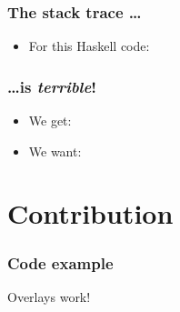 \documentclass[11pt]{beamer} %
\begin{document}
  \begin{frame}
   \frametitle{The stack trace \dots}
  \begin{itemize}
   \item For this Haskell code:
     \HaskellSTCode
  \end{itemize}
  \end{frame}

  \begin{frame}
   \frametitle{\dots is \emph{terrible}!}
  \begin{itemize}
   \item <1-> We get:
     \OriginalTraceCode
   \item <2-> We want:
     \IdealTraceCode
  \end{itemize}
  \end{frame}

\section{Contribution}
\begin{frame}
 \frametitle{}
\end{frame}

\begin{frame}
\frametitle{Code example}
\exampleCode
\pause
Overlays work!
\end{frame}
\end{document}

